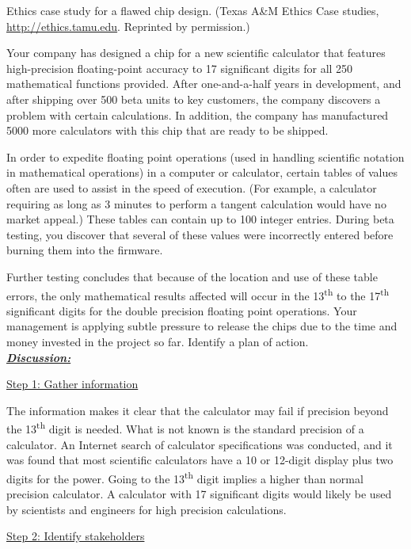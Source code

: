 \begin{example}{Ethics case study for a flawed chip design. (Texas
A\&M Ethics Case studies, \url{http://ethics.tamu.edu}. Reprinted by
permission.)  }
\label{example:ethicsFlawChipDesign}

Your company has designed a chip for a new scientific calculator that
features high-precision floating-point accuracy to 17 significant digits
for all 250 mathematical functions provided. After one-and-a-half years
in development, and after shipping over 500 beta units to key customers,
the company discovers a problem with certain calculations. In addition,
the company has manufactured 5000 more calculators with this chip that
are ready to be shipped.

In order to expedite floating­ point operations (used in handling
scientific notation in mathematical operations) in a computer or
calculator, certain tables of values often are used to assist in the
speed of execution. (For example, a calculator requiring as long as 3
minutes to perform a tangent calculation would have no market appeal.)
These tables can contain up to 100 integer entries. During beta testing,
you discover that several of these values were incorrectly entered
before burning them into the firmware.

Further testing concludes that because of the location and use of these
table errors, the only mathematical results affected will occur in the
13\textsuperscript{th} to the 17\textsuperscript{th} significant digits
for the double­ precision floating point operations. Your management is
applying subtle pressure to release the chips due to the time and money
invested in the project so far. Identify a plan of action.\\

\emph{\textbf{\ul{Discussion:}}}

\ul{Step 1: Gather information}

The information makes it clear that the calculator may fail if precision
beyond the 13\textsuperscript{th} digit is needed. What is not known is
the standard precision of a calculator. An Internet search of calculator
specifications was conducted, and it was found that most scientific
calculators have a 10 or 12-digit display plus two digits for the power.
Going to the 13\textsuperscript{th} digit implies a higher than normal
precision calculator. A calculator with 17 significant digits would
likely be used by scientists and engineers for high precision
calculations.

\ul{Step 2: Identify stakeholders}


\end{example}
